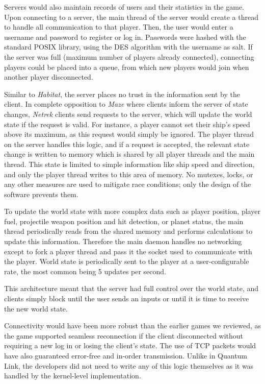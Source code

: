 Servers would also maintain records of users and their statistics in the game. Upon connecting to a server, the main thread of the server would create a thread to handle all communication to that player. Then, the user would enter a username and password to register or log in. Passwords were hashed with the standard POSIX  library, using the DES algorithm with the username as salt. If the server was full (maximum number of players already connected), connecting players could be placed into a queue, from which new players would join when another player disconnected.

Similar to \textit{Habitat}, the server places no trust in the information sent by the client. In complete opposition to \textit{Maze} where clients inform the server of state changes, \textit{Netrek} clients send requests to the server, which will update the world state if the request is valid. For instance, a player cannot set their ship's speed above its maximum, as this request would simply be ignored. The player thread on the server handles this logic, and if a request is accepted, the relevant state change is written to memory which is shared by all player threads and the main thread. This state is limited to simple information like ship speed and direction, and only the player thread writes to this area of memory. No mutexes, locks, or any other measures are used to mitigate race conditions; only the design of the software prevents them.

To update the world state with more complex data such as player position, player fuel, projectile weapon position and hit detection, or planet status, the main thread periodically reads from the shared memory and performs calculations to update this information. Therefore the main daemon handles no networking except to fork a player thread and pass it the socket used to communicate with the player. World state is periodically sent to the player at a user-configurable rate, the most common being 5 updates per second.

This architecture meant that the server had full control over the world state, and clients simply block until the user sends an inputs or until it is time to receive the new world state.

Connectivity would have been more robust than the earlier games we reviewed, as the game supported seamless reconnection if the client disconnected without requiring a new log in or losing the client's state. The use of TCP packets would have also guaranteed error-free and in-order transmission. Unlike in Quantum Link, the developers did not need to write any of this logic themselves as it was handled by the kernel-level implementation.

